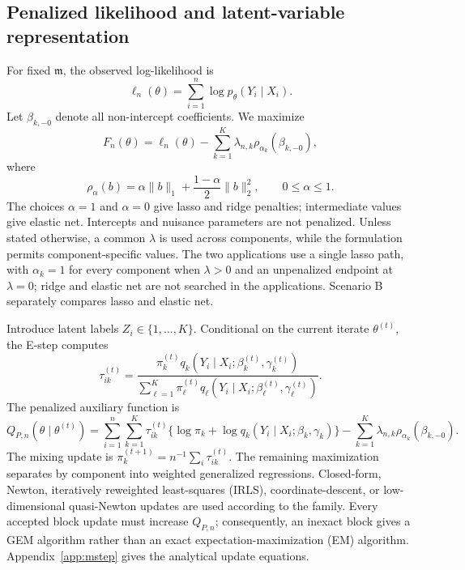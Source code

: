 \documentclass[a4paper,fleqn]{cas-sc}
\newcommand{\model}{\mathfrak m}
\begin{document}
\subsection{Penalized likelihood and latent-variable representation}
\label{sec:penlik}

For fixed $\model$, the observed log-likelihood is
\[
  \ell_n(\theta)=\sum_{i=1}^n\log p_\theta(Y_i\mid X_i).
\]
Let $\beta_{k,-0}$ denote all non-intercept coefficients. We maximize
\begin{equation}
  F_n(\theta)=\ell_n(\theta)-\sum_{k=1}^K\lambda_{n,k}\rho_{\alpha_k}(\beta_{k,-0}),
  \label{eq:penlik}
\end{equation}
where
\[
  \rho_\alpha(b)=\alpha\lVert b\rVert_1+\frac{1-\alpha}{2}\lVert b\rVert_2^2,
  \qquad 0\leq\alpha\leq1.
\]
The choices $\alpha=1$ and $\alpha=0$ give lasso and ridge penalties; intermediate values give elastic net. Intercepts and nuisance parameters are not penalized. Unless stated otherwise, a common $\lambda$ is used across components, while the formulation permits component-specific values. The two applications use a single lasso path, with $\alpha_k=1$ for every component when $\lambda>0$ and an unpenalized endpoint at $\lambda=0$; ridge and elastic net are not searched in the applications. Scenario B separately compares lasso and elastic net.

Introduce latent labels $Z_i\in\{1,\ldots,K\}$. Conditional on the current iterate $\theta^{(t)}$, the E-step computes
\begin{equation}
  \tau_{ik}^{(t)}=
  \frac{\pi_k^{(t)}q_k(Y_i\mid X_i;\beta_k^{(t)},\gamma_k^{(t)})}
       {\sum_{\ell=1}^K\pi_\ell^{(t)}q_\ell(Y_i\mid X_i;\beta_\ell^{(t)},\gamma_\ell^{(t)})}.
  \label{eq:responsibility}
\end{equation}
The penalized auxiliary function is
\begin{equation}
  Q_{P,n}(\theta\mid\theta^{(t)})=
  \sum_{i=1}^n\sum_{k=1}^K\tau_{ik}^{(t)}
  \{\log\pi_k+\log q_k(Y_i\mid X_i;\beta_k,\gamma_k)\}
  -\sum_{k=1}^K\lambda_{n,k}\rho_{\alpha_k}(\beta_{k,-0}).
  \label{eq:qfun}
\end{equation}
The mixing update is $\pi_k^{(t+1)}=n^{-1}\sum_i\tau_{ik}^{(t)}$. The remaining maximization separates by component into weighted generalized regressions. Closed-form, Newton, iteratively reweighted least-squares (IRLS), coordinate-descent, or low-dimensional quasi-Newton updates are used according to the family. Every accepted block update must increase $Q_{P,n}$; consequently, an inexact block gives a GEM algorithm rather than an exact expectation-maximization (EM) algorithm. Appendix~\ref{app:mstep} gives the analytical update equations.
\end{document}
